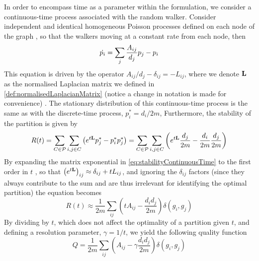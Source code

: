 In order to encompass time as a parameter within the formulation, we consider a continuous-time process associated with the random walker.
Consider independent and identical homogeneous Poisson processes defined on each node of the graph \cite{LDB08}, so that the walkers moving at a constant rate from each node, then
\begin{equation}
	\label{eq:densityRandomWalkerContinuousTime}
	\dot{p_{i}} = \sum_{j} \frac{A_{ij}}{d_{j}} p_{j} - p_{i}
\end{equation}
This equation is driven by the operator $A_{ij}/d_{j} - \delta_{ij} = -L_{ij}$, where we denote $\mathbf L$ as the normalised Laplacian matrix we defined in \cref{def:normalisedLaplacianMatrix} (notice a change in notation is made for convenience) \cite{MRM+10}.
The stationary distribution of this continuous-time process is the same as with the discrete-time process, $p_{i}^{*} = d_{i}/2m$,
Furthermore, the stability of the partition is given by
\begin{equation}
	\label{eq:stabilityContinuousTime}
	R(t) = \sum_{C \in \mathcal P} \sum_{i,j \in C} \left( e^{t \mathbf L} p_{j}^{*} - p_{i}^{*} p_{j}^{*} \right) = \sum_{C \in \mathcal P} \sum_{i,j \in C} \left( e^{t \mathbf L} \frac{d_{j}}{2m} - \frac{d_{i}}{2m} \frac{d_{j}}{2m} \right)
\end{equation}
By expanding the matrix exponential in \cref{eq:stabilityContinuousTime} to the first order in $t$ \cite{LDB08}, so that $\left( e^{t \mathbf L} \right)_{ij} \approx \delta_{ij} + tL_{ij}$, and ignoring the $\delta_{ij}$ factors (since they always contribute to the sum and are thus irrelevant for identifying the optimal partition) the equation becomes
\begin{equation}
	\label{eq:stabilityContinuousTimeApproximation}
	R(t) \approx \frac{1}{2m} \sum_{ij} \left( tA_{ij} - \frac{d_{i}d_{j}}{2m} \right) \delta(g_{i},g_{j})
\end{equation}
By dividing by $t$, which does not affect the optimality of a partition given $t$, and defining a resolution parameter, $\gamma = 1/t$, we yield the following quality function
\begin{equation}
	\label{eq:modularityFromStabilityContinuousTimeApproximation}
	Q = \frac{1}{2m} \sum_{ij} \left( A_{ij} - \gamma \frac{d_{i}d_{j}}{2m} \right) \delta(g_{i},g_{j})
\end{equation}


